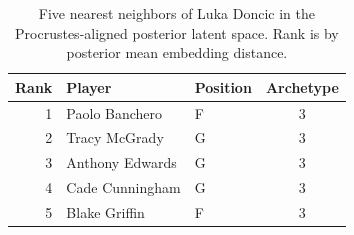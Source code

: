 \begin{table}[htbp]
  \centering\small
  \begin{tabular}{rllc}
    \toprule
    Rank & Player & Position & Archetype \\
    \midrule
    1 & Paolo Banchero & F & 3 \\
    2 & Tracy McGrady & G & 3 \\
    3 & Anthony Edwards & G & 3 \\
    4 & Cade Cunningham & G & 3 \\
    5 & Blake Griffin & F & 3 \\
    \bottomrule
  \end{tabular}
  \caption{Five nearest neighbors of Luka Doncic in the Procrustes-aligned posterior latent space. Rank is by posterior mean embedding distance.}
  \label{tab:Luka_Doncic_neighbors}
\end{table}

